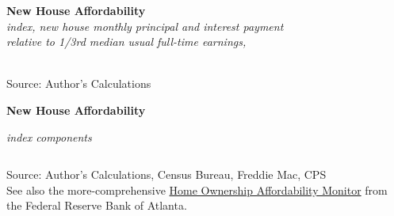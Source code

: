 \documentclass{report}
\makeatletter
\newcommand{\tbllink}[1]{\href{https://raw.githubusercontent.com/bdecon/US-chartbook/master/chartbook/data/#1}{\faTable}}
\newcommand*\short[1]{\expandafter\@gobbletwo\number\numexpr#1\relax}
\newcommand{\absnode}[3]{\node[below right, align=left] at (axis cs: #1,#2) {#3};}
\newcommand{\shdateaxisticks}{
		date coordinates in=x, axis line style={draw=none},
		xmax={2024-01-31},
		max space between ticks=40,	    
		xtick={{1990-01-01}, {1995-01-01}, {2000-01-01}, 
			{2005-01-01}, {2010-01-01}, {2015-01-01}, {2020-01-01}},
		minor xtick={},
		enlarge y limits={0.06}, enlarge x limits={0.01},
		xticklabel style={align=center, yshift=-2pt}, tick label style={inner sep=0pt},
		}
\newcommand{\dbar}[2]{extra #1 ticks = {{#2}}, extra #1 tick labels = ,
		extra #1 tick style = {grid=major, grid style={dashed, thick, black!50}},}
\newcommand{\thinline}[4]{\addplot[no markers, color=#1] 
		table [x=#2, y=#3, col sep=comma] {#4};	}
\newcommand{\rbars}{
		\fill[color=black!10] (axis cs:{1990-07-01},\pgfkeysvalueof{/pgfplots/ymin})
			rectangle (axis cs:{1991-03-01}, \pgfkeysvalueof{/pgfplots/ymax});
		\fill[color=black!10] (axis cs:{2007-12-01},\pgfkeysvalueof{/pgfplots/ymin})
			rectangle (axis cs:{2009-07-01}, \pgfkeysvalueof{/pgfplots/ymax});
		\fill[color=black!10] (axis cs:{2001-03-01},\pgfkeysvalueof{/pgfplots/ymin})
			rectangle (axis cs:{2001-11-01}, \pgfkeysvalueof{/pgfplots/ymax});
		\fill[color=black!10] (axis cs:{2020-02-01},\pgfkeysvalueof{/pgfplots/ymin})
			rectangle (axis cs:{2020-05-01}, \pgfkeysvalueof{/pgfplots/ymax});}
\makeatother
\begin{document}
{\begin{minipage}{0.46\textwidth} 
\normalsize{\textbf{New House Affordability}}\\
\footnotesize{\textit{index, new house monthly principal and interest payment}}\\
\footnotesize{\textit{relative to 1/3rd median usual full-time earnings,}}\\
\hspace*{-1.5mm} \\
\footnotesize{Source: Author's Calculations} \hfill \tbllink{nha.csv} \ 
\end{minipage} \hspace{4.5mm}
\begin{minipage}{0.26\textwidth}
\small  
\end{minipage}
\vspace{2mm}

\begin{minipage}{1.0\textwidth}
\normalsize \textbf{New House Affordability}\\
\footnotesize{\textit{index components}\\
\hspace*{-2mm}  \setlength{\tabcolsep}{2.2pt} \color{black!90}
		{\renewcommand{\arraystretch}{1.54}
\begin{tabular}{p{37mm} R{11mm} R{12mm} R{12mm} R{12mm}
		 		 R{12mm} R{12mm}}
			  \hline
		\end{tabular}}}

\vspace{-2mm}		
\footnotesize{Source: Author's Calculations, Census Bureau, Freddie Mac, CPS} \hfill \tbllink{nha_ts.csv} \\
\footnotesize{See also the more-comprehensive \href{https://www.atlantafed.org/center-for-housing-and-policy/data-and-tools/home-ownership-affordability-monitor}{Home Ownership Affordability Monitor} from the Federal Reserve Bank of Atlanta.}
\end{minipage}
\newpage
}
\end{document}
